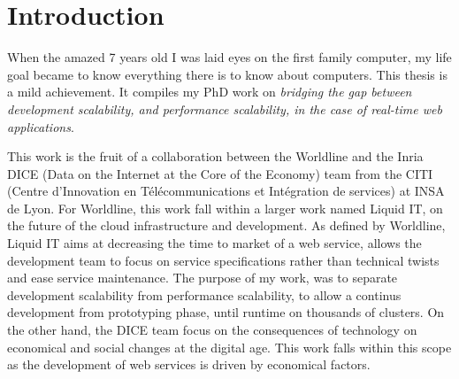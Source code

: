 \chapter{Introduction} \label{chapter:conclusion}



When the amazed 7 years old I was laid eyes on the first family computer, my life goal became to know everything there is to know about computers.
This thesis is a mild achievement.
It compiles my PhD work on
\textit{bridging the gap between development scalability, and performance scalability, in the case of real-time web applications}.





This work is the fruit of a collaboration between the Worldline and the Inria DICE (Data on the Internet at the Core of the Economy) team from the CITI (Centre d’Innovation en Télécommunications et Intégration
de services) at INSA de Lyon.
For Worldline, this work fall within a larger work named Liquid IT, on the future of the cloud infrastructure and development.
As defined by Worldline, Liquid IT aims at decreasing the time to market of a web service, allows the development team to focus on service specifications rather than technical twists and ease service maintenance.
The purpose of my work, was to separate development scalability from performance scalability, to allow a continus development from prototyping phase, until runtime on thousands of clusters.
On the other hand, the DICE team focus on the consequences of technology on economical and social changes at the digital age.
This work falls within this scope as the development of web services is driven by economical factors.

